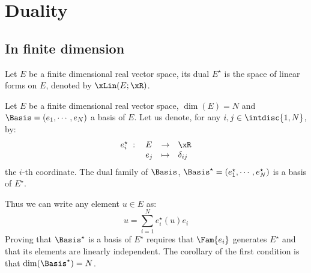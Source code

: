 
\chapter{Duality}

\section{In finite dimension}

\begin{dfntn}
Let $E$ be a finite dimensional real vector space, its dual $E^\star$ is the space of linear forms on $E$, denoted by $\xLin(E;\xR)$.
\end{dfntn}

\begin{dfntn}
Let $E$ be a finite dimensional real vector space, $\dim(E) = N$ and $\Basis = (e_1,\cdots,e_N)$ a basis of $E$.
Let us denote, for any $i,j \in \intdisc{1,N}$, by:
\begin{equation*}
\begin{array}{lllll}
e^\star_i\;:\: & E   & \fromto & \xR \\
  \hfill       & e_j & \mapsto & \delta_{ij}
\end{array}
\end{equation*}
the $i$-th coordinate.
The dual family of $\Basis$, $\Basis^\star = (e^\star_1,\cdots,e^\star_N)$ is a basis of $E^\star$.
\end{dfntn}

Thus we can write any element $u \in E$ as:
\begin{equation*}
u = \sum_{i=1}^N  e_i^\star(u) e_i
\end{equation*}
Proving that $\Basis^\star$ is a basis of $E^\star$ requires that $\Fam{e_i}$ generates $E^\star$ and that its elements are linearly independent.
The corollary of the first condition is that $\dim(\Basis^\star) = N$.
